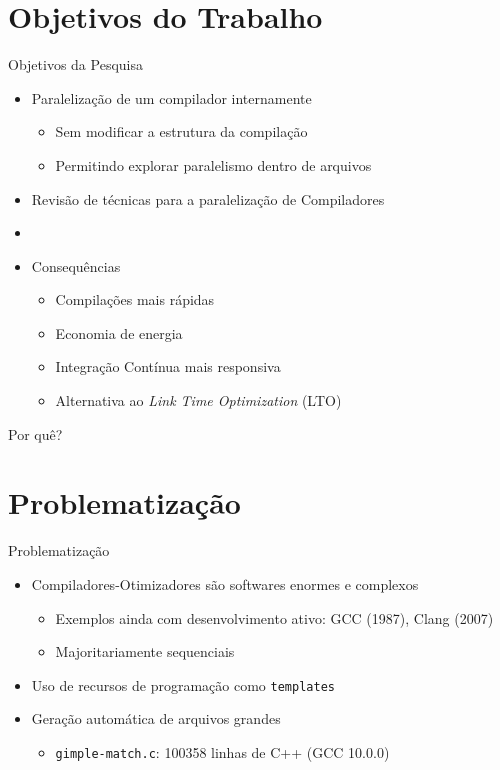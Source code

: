 \section{Objetivos do Trabalho}

\begin{frame}{Objetivos da Pesquisa}
    \begin{itemize}
        \item Paralelização de um compilador internamente
        \begin{itemize}
            \item Sem modificar a estrutura da compilação
            \item Permitindo explorar paralelismo dentro de arquivos
        \end{itemize}
        \item Revisão de técnicas para a paralelização de Compiladores
        \item[]
        \item Consequências
        \begin{itemize}
            \item Compilações mais rápidas
            \item Economia de energia
            \item Integração Contínua mais responsiva
            \item Alternativa ao \textit{Link Time Optimization} (LTO)
        \end{itemize}
    \end{itemize}
\end{frame}



\begin{frame}[standout]
    Por quê?
\end{frame}

\section{Problematização}

\begin{frame}{Problematização}
  \begin{itemize}
    \item Compiladores-Otimizadores são softwares enormes e complexos
        \begin{itemize}
            \item Exemplos ainda com desenvolvimento ativo: GCC (1987), Clang (2007)
            \item Majoritariamente sequenciais
        \end{itemize}
    \item Uso de recursos de programação como \texttt{templates}
    \item Geração automática de arquivos grandes
        \begin{itemize}
            \item \texttt{gimple-match.c}: 100358 linhas de C++ (GCC 10.0.0)
        \end{itemize}
  \end{itemize}
\end{frame}
    
